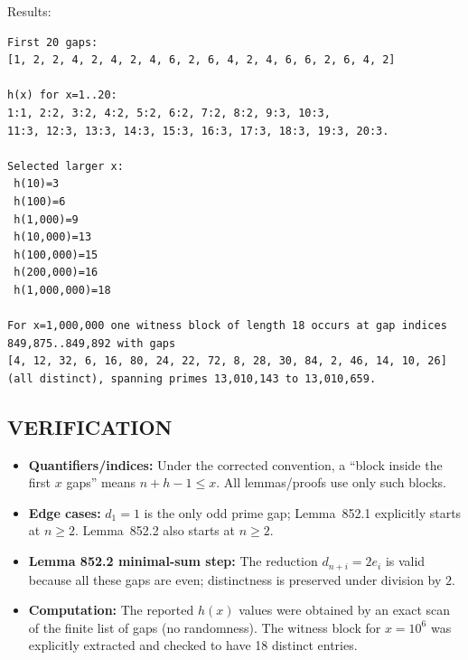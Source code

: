 Results:
\begin{verbatim}
First 20 gaps:
[1, 2, 2, 4, 2, 4, 2, 4, 6, 2, 6, 4, 2, 4, 6, 6, 2, 6, 4, 2]

h(x) for x=1..20:
1:1, 2:2, 3:2, 4:2, 5:2, 6:2, 7:2, 8:2, 9:3, 10:3,
11:3, 12:3, 13:3, 14:3, 15:3, 16:3, 17:3, 18:3, 19:3, 20:3.

Selected larger x:
 h(10)=3
 h(100)=6
 h(1,000)=9
 h(10,000)=13
 h(100,000)=15
 h(200,000)=16
 h(1,000,000)=18

For x=1,000,000 one witness block of length 18 occurs at gap indices
849,875..849,892 with gaps
[4, 12, 32, 6, 16, 80, 24, 22, 72, 8, 28, 30, 84, 2, 46, 14, 10, 26]
(all distinct), spanning primes 13,010,143 to 13,010,659.
\end{verbatim}

\subsection*{VERIFICATION}
\begin{itemize}
\item \textbf{Quantifiers/indices:} Under the corrected convention, a ``block inside the first $x$ gaps'' means $n+h-1\le x$. All lemmas/proofs use only such blocks.
\item \textbf{Edge cases:} $d_1=1$ is the only odd prime gap; Lemma~852.1 explicitly starts at $n\ge 2$. Lemma~852.2 also starts at $n\ge 2$.
\item \textbf{Lemma 852.2 minimal-sum step:} The reduction $d_{n+i}=2e_i$ is valid because all these gaps are even; distinctness is preserved under division by $2$.
\item \textbf{Computation:} The reported $h(x)$ values were obtained by an exact scan of the finite list of gaps (no randomness). The witness block for $x=10^6$ was explicitly extracted and checked to have 18 distinct entries.
\end{itemize}

